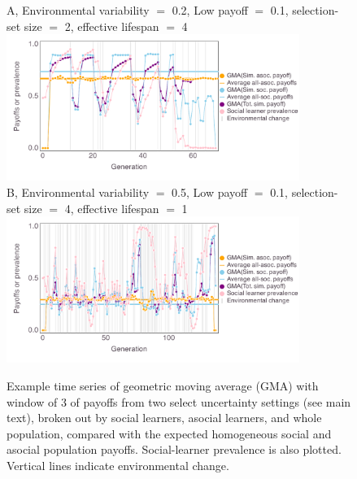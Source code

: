 \documentclass[letterpaper,11.5pt]{scrartcl}
\begin{document}
\begin{figure}
  \addtocounter{figure}{-1}
    \caption{Example time series of geometric moving average (GMA) with window of 3
      of payoffs from two select uncertainty settings (see main text), broken out by
    social learners, asocial learners, and whole population, compared with the
    expected homogeneous social and asocial population payoffs. Social-learner prevalence is also plotted. Vertical lines indicate environmental change.}
    \label{fig:payoffTimeseries}
  \centering    

\vspace{1em}
\hspace{-2em}

      \centering
      {\textsf A, Environmental variability $=$ 0.2, Low payoff $=$ 0.1, selection-set size $=$ 2, effective lifespan $=$ 4} \\
      \includegraphics[width=0.85\textwidth]{Figures/geopayoff_series/geopayseries_u=0.2-lowpayoff=0.1-nbehaviors=2-L=4.pdf} \\

      {\textsf B, Environmental variability $=$ 0.5, Low payoff $=$ 0.1, selection-set size $=$ 4, effective lifespan $=$ 1} \\
      \includegraphics[width=0.85\textwidth]{Figures/geopayoff_series/geopayseries_u=0.5-lowpayoff=0.1-nbehaviors=4-L=1.pdf}
    
\hspace{-2em}


\end{figure}
\end{document}
